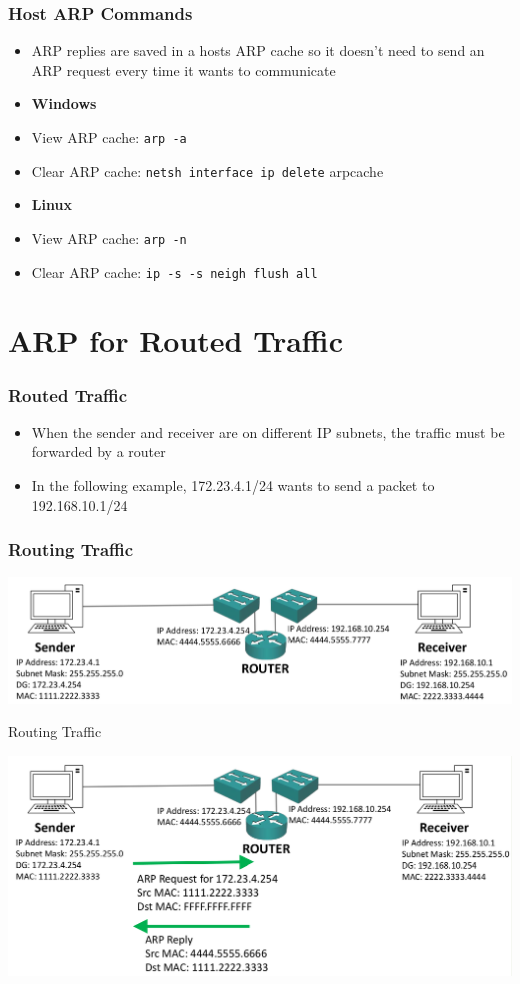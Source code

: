 \documentclass[pdflatex,compress,mathserif]{beamer}
\begin{document}
\begin{frame}
	\frametitle{Host ARP Commands}
	\begin{itemize}
		\item ARP replies are saved in a hosts ARP cache so it doesn’t need to send an ARP request every time it wants to communicate
		\item \textbf{Windows}
		\item[] View ARP cache: \texttt{arp -a}
		\item[] Clear ARP cache: \texttt{netsh interface ip delete} arpcache
		\item \textbf{Linux}
		\item[] View ARP cache: \texttt{arp -n}
		\item[] Clear ARP cache: \texttt{ip -s -s neigh flush all}
	\end{itemize}
\end{frame}

\section{ARP for Routed Traffic}

\begin{frame}
	\frametitle{Routed Traffic}
	\begin{itemize}
		\item When the sender and receiver are on different IP subnets, the traffic must be forwarded by a router
		\item In the following example, 172.23.4.1/24 wants to send a packet to 192.168.10.1/24
	\end{itemize}
\end{frame}

\begin{frame}
	\frametitle{Routing Traffic}
	\begin{center}
		\includegraphics[width=\linewidth]{img/img09}
	\end{center}
\end{frame}

\begin{frame}{Routing Traffic}
	\begin{center}
		\includegraphics[width=\linewidth]{img/img10}
	\end{center}
\end{frame}
\end{document}
